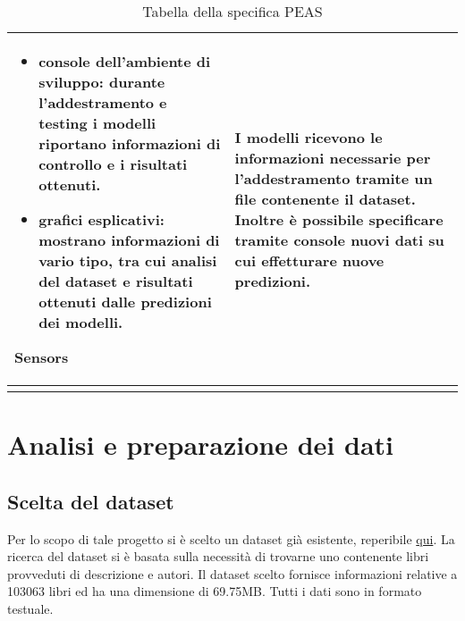 \documentclass[12pt,oneside]{article}
\begin{document}
\begin{enumerate}
\begin{longtable}{ | p{3cm} | p{11cm} | }
\begin{itemize}
    \item console dell'ambiente di sviluppo: durante l'addestramento e testing i modelli riportano informazioni di controllo e i risultati ottenuti.
    \item grafici esplicativi: mostrano informazioni di vario tipo, tra cui analisi del dataset e risultati ottenuti dalle predizioni dei modelli.\end{itemize}
    \hline
    \rowcolor{lightsteelblue}
    \textbf{Sensors} & I modelli ricevono le informazioni necessarie per l'addestramento tramite un file contenente il dataset. Inoltre è possibile specificare tramite console nuovi dati su cui effetturare nuove predizioni. \\
    \hline
    \caption{Tabella della specifica PEAS}
    \end{longtable}
\label{table:ta}
\end{enumerate}

    

\section{Analisi e preparazione dei dati}
    \begin{enumerate}
    \subsection{Scelta del dataset}
    \begin{justify}
    Per lo scopo di tale progetto si è scelto un dataset già esistente, reperibile \href{https://www.kaggle.com/datasets/elvinrustam/books-dataset}{qui}. La ricerca del dataset si è basata sulla necessità di trovarne uno contenente libri provveduti di descrizione e autori. Il dataset scelto fornisce informazioni relative a 103063 libri ed ha una dimensione di 69.75MB. Tutti i dati sono in formato testuale.
    \end{justify}
    \end{enumerate}
\end{document}
